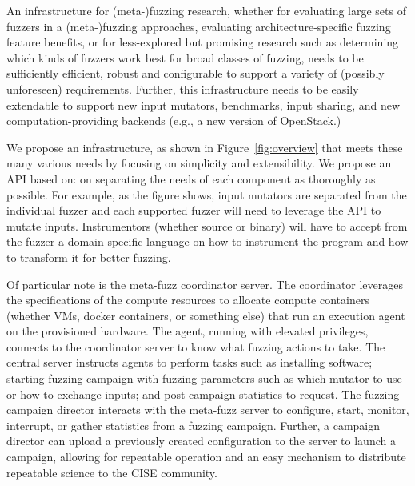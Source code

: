 



An infrastructure for (meta-)fuzzing research, 
whether for evaluating large sets of fuzzers in a (meta-)fuzzing approaches, 
evaluating architecture-specific fuzzing feature benefits, 
or for less-explored but promising research such as determining which kinds of 
fuzzers work best for broad classes of fuzzing, needs to be sufficiently 
efficient, robust and configurable to support a variety of (possibly 
unforeseen) requirements.  
Further, this infrastructure needs to be easily extendable to support new input 
mutators, benchmarks, input sharing, and new computation-providing backends 
(e.g., a new version of OpenStack.)

We propose an infrastructure, as shown in Figure~\ref{fig:overview} 
that meets these many various needs by focusing on 
simplicity and extensibility.  We propose an API based on:
on separating the needs of each component as thoroughly as possible.
For example, as the figure shows, input mutators are separated from the
individual fuzzer and each supported fuzzer will need to leverage the API to
mutate inputs.  Instrumentors (whether source or binary) will have to accept 
from the fuzzer a domain-specific language on how to instrument the program
and how to transform it for better fuzzing.  

Of particular note is the meta-fuzz coordinator server.
The coordinator leverages the specifications
of the compute resources to allocate compute containers (whether VMs, 
docker containers, or something else) that run an execution agent 
on the provisioned hardware.   The agent, running with elevated privileges, 
connects to the coordinator server to know what fuzzing actions to take.
The central server instructs agents to perform tasks such as 
installing software; starting fuzzing campaign with fuzzing parameters such as 
which mutator to use or how to exchange inputs; and post-campaign statistics to request.
The fuzzing-campaign director interacts with the meta-fuzz server to configure, start, 
monitor, interrupt, or gather statistics from a fuzzing campaign.  Further, a 
campaign director can upload a previously created configuration to the server 
to launch a campaign, allowing for repeatable operation and an easy mechanism to distribute
repeatable science to the CISE community.  

